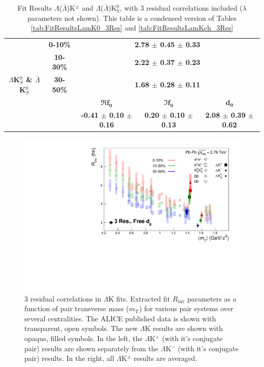 \documentclass[../AnalysisNoteJBuxton.tex]{subfiles}
\begin{document}
\begin{landscape}
\begin{table}[htbp]
{\begin{tabular}{|c|c|c|c|c|}
  \multirow{5}{*}{\large \textbf{$\Lambda$K$^{0}_{S}$ \& $\bar{\Lambda}$K$^{0}_{S}$}}  
   &  \textbf{0-10\%} & \multicolumn{3}{c|}{\textbf{2.78 $\pm$ 0.45 $\pm$ 0.33}} \\  %
   & \textbf{10-30\%} & \multicolumn{3}{c|}{\textbf{2.22 $\pm$ 0.37 $\pm$ 0.23}} \\  %
   & \textbf{30-50\%} & \multicolumn{3}{c|}{\textbf{1.68 $\pm$ 0.28 $\pm$ 0.11}} \\  %
   \cline{2-5}   
   & & \large $\mathbf{\Re f_{0}}$ & \large $\mathbf{\Im f_{0}}$ & \large $\mathbf{d_{0}}$ \\
   \cline{3-5} 
   & & \textbf{-0.41 $\pm$ 0.10 $\pm$ 0.16} & \textbf{0.20 $\pm$ 0.10 $\pm$ 0.13} & \textbf{2.08 $\pm$ 0.39 $\pm$ 0.62} \\
  \hline
 \end{tabular}}
 \caption{Fit Results $\Lambda$($\bar{\Lambda}$)K$^{\pm}$ and $\Lambda$($\bar{\Lambda}$)K$^{0}_{\mathrm{S}}$, with 3 residual correlations included ($\lambda$ parameters not shown).  This table is a condensed version of Tables \ref{tab:FitResultsLamK0_3Res} and \ref{tab:FitResultsLamKch_3Res}} 
 \label{tab:FitResultsLamKCondensed_3Res}
\end{table}

\end{landscape}
\pagestyle{plain}


\begin{figure}[h]
  \centering
  \includegraphics[width=\textwidth]{7_ResultsAndDiscussion/Figures/mTscaling_MinvCalc_OutlinedPoints_OthersTransparent_3Res_FreeD0.pdf}
  \caption[$m_{\mathrm{T}}$ Scaling of Radii: 3 Residuals in Fit]{3 residual correlations in $\Lambda$K fits.  Extracted fit $R_{\mathrm{inv}}$ parameters as a function of pair transverse mass ($m_{\mathrm{T}}$) for various pair systems over several centralities. The ALICE published data \cite{Adam:2015vja} is shown with transparent, open symbols.  The new $\Lambda$K results are shown with opaque, filled symbols.  In the left, the $\Lambda$K$^{+}$ (with it's conjugate pair) results are shown separately from the $\Lambda$K$^{-}$ (with it's conjugate pair) results.  In the right, all $\Lambda$K$^{\pm}$ results are averaged.}
  \label{fig:mTScalingOfRadii_3Res}
\end{figure}

\clearpage
\end{document}
